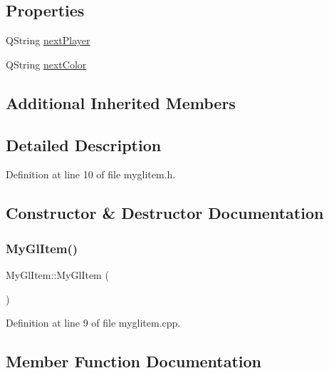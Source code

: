 \subsection*{Properties}
\begin{DoxyCompactItemize}
\item 
Q\+String \mbox{\hyperlink{class_my_gl_item_abc171f46578b349ef427434969ae2220}{next\+Player}}
\item 
Q\+String \mbox{\hyperlink{class_my_gl_item_a0231b71bc8a4bd91b69b498c8f4a9483}{next\+Color}}
\end{DoxyCompactItemize}
\subsection*{Additional Inherited Members}


\subsection{Detailed Description}


Definition at line 10 of file myglitem.\+h.



\subsection{Constructor \& Destructor Documentation}
\mbox{\label{class_my_gl_item_a6d3e3403cb04102489d3be0deddbc1ff}} 
\subsubsection{\texorpdfstring{MyGlItem()}{MyGlItem()}}
{\footnotesize\ttfamily My\+Gl\+Item\+::\+My\+Gl\+Item (\begin{DoxyParamCaption}{ }\end{DoxyParamCaption})}



Definition at line 9 of file myglitem.\+cpp.



\subsection{Member Function Documentation}
\mbox{\label{class_my_gl_item_a613c4a856e605fffbcf0968f821e8823}} 

